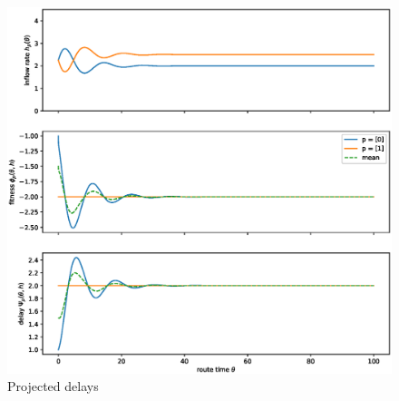 \documentclass[10pt]{beamer}
\begin{document}
\begin{frame}
  

	\begin{center}
		\begin{figure}
			\includegraphics[scale=0.3]{img/pres-replicator_proj_tt.eps}
			\caption{Projected delays}	
		\end{figure}	  
	\end{center}  
  
\end{frame}
\end{document}
